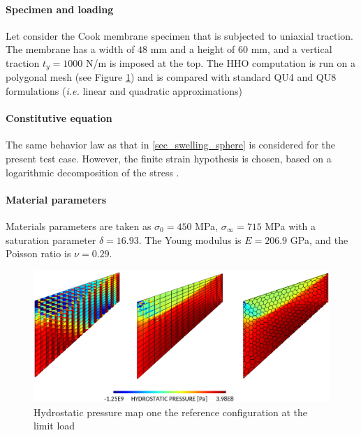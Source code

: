 \paragraph{Specimen and loading}

Let consider the Cook membrane specimen that is subjected to uniaxial
traction. The membrane has a width of $48$ mm and a height of $60$ mm,
and a vertical traction $t_y = 1000$ N/m is imposed at the top. The HHO
computation is run on a polygonal mesh (see Figure \ref{fig_cook}) and
is compared with standard QU4 and QU8 formulations (\textit{i.e.} linear
and quadratic approximations)

\paragraph{Constitutive equation}

The same behavior law as that in \ref{sec_swelling_sphere} is
considered for the present test case. However, the finite strain
hypothesis is chosen, based on a logarithmic decomposition of the stress
\cite{miehe_anisotropic_2002}.

\paragraph{Material parameters}

Materials parameters are taken as
$\sigma_0 = 450$ MPa, $\sigma_{\infty} = 715$ MPa with a saturation parameter $\delta = 16.93$. The Young modulus is $E = 206.9$ GPa, and the Poisson ratio is $\nu = 0.29$.

\begin{figure}[H]
    \centering
    \includegraphics[width=12.cm]{../chapter_002_hho_mechanics/figures/cook_comp.png}
    \caption{Hydrostatic pressure map one the reference configuration at the limit load}
    \label{fig_cook}
\end{figure}

